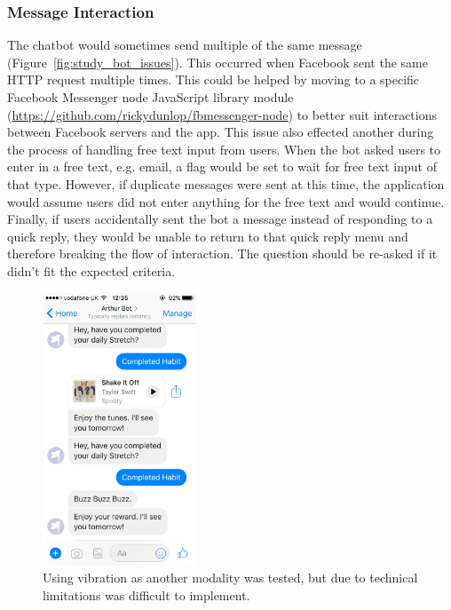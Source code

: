 \subsubsection*{Message Interaction}
The chatbot would sometimes send multiple of the same message (Figure~\ref{fig:study_bot_issues}). This occurred when Facebook sent the same HTTP request multiple times. This could be helped by moving to a specific Facebook Messenger node JavaScript library module (\url{https://github.com/rickydunlop/fbmessenger-node}) to better suit interactions between Facebook servers and the app. This issue also effected another during the process of handling free text input from users. When the bot asked users to enter in a free text, e.g. email, a flag would be set to wait for free text input of that type. However, if duplicate messages were sent at this time, the application would assume users did not enter anything for the free text and would continue. Finally, if users accidentally sent the bot a message instead of responding to a quick reply, they would be unable to return to that quick reply menu and therefore breaking the flow of interaction. The question should be re-asked if it didn't fit the expected criteria.

\begin{figure}[H]
    \centering
    \includegraphics[width=1.8in]{../resources/design/vibration-reward.png}
    \caption{Using vibration as another modality was tested, but due to technical limitations was difficult to implement.}
    \label{fig:vibration_reward_issue}
\end{figure}

